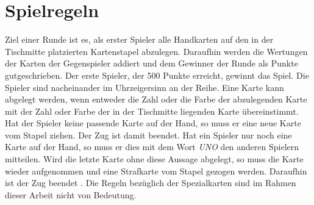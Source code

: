 \section{Spielregeln}
Ziel einer Runde ist es, als erster Spieler alle Handkarten auf den in der Tischmitte platzierten Kartenstapel abzulegen. Daraufhin werden die Wertungen der Karten der Gegenspieler addiert und dem Gewinner der Runde als Punkte gutgeschrieben. Der erste Spieler, der 500 Punkte erreicht, gewinnt das Spiel. Die Spieler sind nacheinander im Uhrzeigersinn an der Reihe. Eine Karte kann abgelegt werden, wenn entweder die Zahl oder die Farbe der abzulegenden Karte mit der Zahl oder Farbe der in der Tischmitte liegenden Karte übereinstimmt. Hat der Spieler keine passende Karte auf der Hand, so muss er eine neue Karte vom Stapel ziehen. Der Zug ist damit beendet. Hat ein Spieler nur noch eine Karte auf der Hand, so muss er dies mit dem Wort \textit{UNO} den anderen Spielern mitteilen. Wird die letzte Karte ohne diese Aussage abgelegt, so muss die Karte wieder aufgenommen und eine Strafkarte vom Stapel gezogen werden. Daraufhin ist der Zug beendet \cite{UnoRules}. Die Regeln bezüglich der Spezialkarten sind im Rahmen dieser Arbeit nicht von Bedeutung.